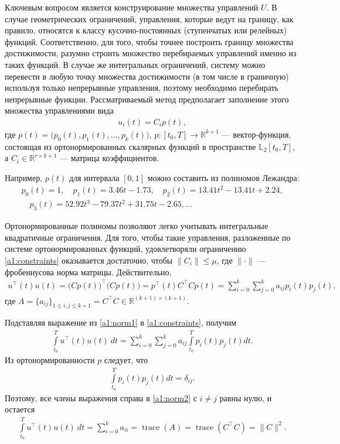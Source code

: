 \documentclass[../main.tex]{subfiles}
\begin{document}
  Ключевым вопросом является конструирование множества управлений $U$.
  В случае геометрических ограничений, управления, которые ведут на границу, как правило, относятся к классу кусочно-постоянных (ступенчатых или релейных) функций.
  Соответственно, для того, чтобы точнее построить границу множества достижимости, разумно строить множество перебираемых управлений именно из таких функций. 
  В случае же интегральных ограничений, систему можно перевести в любую точку множества достижимости (в том числе в граничную) используя только непрерывные управления, поэтому необходимо перебирать непрерывные функции. 
  Рассматриваемый метод предполагает заполнение этого множества управлениями вида 
  \begin{gather}\label{a1:control}
  	u_i(t) = C_i p (t),
  \end{gather}
  где $p(t) = \big(p_{0}(t),p_{1}(t),\dots,p_{k}(t)\big)$, $p: [t_0, {T}] \rightarrow \mathbb{R}^{k+1} $ --- вектор-функция, состоящая из ортонормированных скалярных функций в пространстве $\mathbb{L}_2[t_0, {T}]$, а $C_i \in \mathbb{R}^{r \times k+1}$ --- матрица коэффициентов. 
	  
  Например, $p(t)$ для интервала $[0,1]$ можно составить из полиномов Лежандра:
  \begin{gather*}
  	p_0(t) = 1, \quad p_1(t) = 3.46t-1.73, \quad p_2(t) = 13.41t^2 - 13.41t + 2.24, \\ \quad 
  	p_3(t) = 52.92t^3 - 79.37t^2+31.75t -2.65, ...
  \end{gather*}
  
  Ортонормированные полиномы позволяют легко учитывать интегральные квадратичные ограничения.
  Для того, чтобы такие управления, разложенные по системе ортонормированных функций, удовлетворяли ограничению \eqref{a1:constraints} оказывается достаточно, чтобы $\|C_i\| \leqslant \mu$, где $\|\cdot\| $ --- фробениусова норма матрицы.
  Действительно,
  \begin{gather}\label{a1:norm1}
  	 u^{\top}(t) u(t) = \big(C p(t)\big)^{\top} \big(C p(t)\big) = p^{\top}(t) C^{\top} C p(t) = \sum_{i=0}^k \sum_{j=0}^k a_{ij} p_i(t) p_j(t),
  \end{gather}
  где $ A = \{a_{ij}\}_{1\leqslant i,j \leqslant k + 1} = C^{\top} C \in \mathbb{R}^{(k+1) × (k+1)} $.
  
  Подставляя выражение из \eqref{a1:norm1} в \eqref{a1:constraints}, получим
  \begin{gather}\label{a1:norm2}
  		\int\limits_{t_0}^T u^{\top}(t) u(t) \ dt = \sum_{i=0}^k \sum_{j=0}^k a_{ij} \int\limits_{t_0}^T p_i(t) p_j(t) dt.
  \end{gather}
  Из ортонормированности $p$ следует, что 
  \begin{gather}
  	\int\limits_{t_0}^T p_i(t) p_j(t) dt = \delta_{ij}. 
  \end{gather}
  Поэтому, все члены выражения справа в \eqref{a1:norm2}  с $i \neq j$ равны нулю, и остается 
  \begin{gather}
  	\int\limits_{t_0}^T u^{\top}(t) u(t) \ dt =  \sum_{i=0}^k  a_{ii} = \operatorname{trace}(A) = \operatorname{trace}(C^{\top} C) = \| C\|^2.
  \end{gather}
  
\end{document}

